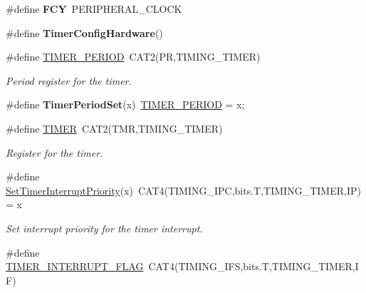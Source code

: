 \begin{DoxyCompactItemize}
\item 
\hypertarget{group__timing_ga99d7c812ba23bfdba5d29ec2fddf1e83}{\#define {\bfseries F\+C\+Y}~P\+E\+R\+I\+P\+H\+E\+R\+A\+L\+\_\+\+C\+L\+O\+C\+K}\label{group__timing_ga99d7c812ba23bfdba5d29ec2fddf1e83}

\item 
\hypertarget{group__timing_ga4f7e9d12b2114a53b35b5effe74cebb0}{\#define {\bfseries Timer\+Config\+Hardware}()}\label{group__timing_ga4f7e9d12b2114a53b35b5effe74cebb0}

\item 
\hypertarget{group__timing_gad888acf7c13a4bedd6541ceb5cf9bf6d}{\#define \hyperlink{group__timing_gad888acf7c13a4bedd6541ceb5cf9bf6d}{T\+I\+M\+E\+R\+\_\+\+P\+E\+R\+I\+O\+D}~C\+A\+T2(P\+R,T\+I\+M\+I\+N\+G\+\_\+\+T\+I\+M\+E\+R)}\label{group__timing_gad888acf7c13a4bedd6541ceb5cf9bf6d}

\begin{DoxyCompactList}\small\item\em Period register for the timer. \end{DoxyCompactList}\item 
\hypertarget{group__timing_ga552c0784e039bde9cd8c9784bab5ccca}{\#define {\bfseries Timer\+Period\+Set}(x)~\hyperlink{group__timing_gad888acf7c13a4bedd6541ceb5cf9bf6d}{T\+I\+M\+E\+R\+\_\+\+P\+E\+R\+I\+O\+D} = x;}\label{group__timing_ga552c0784e039bde9cd8c9784bab5ccca}

\item 
\hypertarget{group__timing_ga599217205dc3092c26567a2bd868ef3a}{\#define \hyperlink{group__timing_ga599217205dc3092c26567a2bd868ef3a}{T\+I\+M\+E\+R}~C\+A\+T2(T\+M\+R,T\+I\+M\+I\+N\+G\+\_\+\+T\+I\+M\+E\+R)}\label{group__timing_ga599217205dc3092c26567a2bd868ef3a}

\begin{DoxyCompactList}\small\item\em Register for the timer. \end{DoxyCompactList}\item 
\hypertarget{group__timing_ga4f39eec8a19f65a58e63ae19fa35e761}{\#define \hyperlink{group__timing_ga4f39eec8a19f65a58e63ae19fa35e761}{Set\+Timer\+Interrupt\+Priority}(x)~C\+A\+T4(T\+I\+M\+I\+N\+G\+\_\+\+I\+P\+C,bits.\+T,T\+I\+M\+I\+N\+G\+\_\+\+T\+I\+M\+E\+R,I\+P) = x}\label{group__timing_ga4f39eec8a19f65a58e63ae19fa35e761}

\begin{DoxyCompactList}\small\item\em Set interrupt priority for the timer interrupt. \end{DoxyCompactList}\item 
\hypertarget{group__timing_ga5e404b05086df678e0dc0b5d1d03d648}{\#define \hyperlink{group__timing_ga5e404b05086df678e0dc0b5d1d03d648}{T\+I\+M\+E\+R\+\_\+\+I\+N\+T\+E\+R\+R\+U\+P\+T\+\_\+\+F\+L\+A\+G}~C\+A\+T4(T\+I\+M\+I\+N\+G\+\_\+\+I\+F\+S,bits.\+T,T\+I\+M\+I\+N\+G\+\_\+\+T\+I\+M\+E\+R,I\+F)}\label{group__timing_ga5e404b05086df678e0dc0b5d1d03d648}


\end{DoxyCompactItemize}
